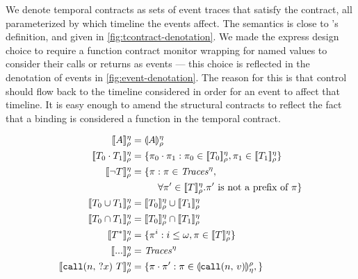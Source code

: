 \documentclass[preprint,onecolumn,9pt]{sigplanconf} %
\begin{document}
We denote temporal contracts as sets of event traces that satisfy the contract, all parameterized by which timeline the events affect.
%
The semantics is close to \citeauthor{ianjohnson:dfm:icfp2011}'s definition, and given in \autoref{fig:tcontract-denotation}.
%
We made the express design choice to require a function contract monitor wrapping for named values to consider their calls or returns as events --- this choice is reflected in the denotation of events in \autoref{fig:event-denotation}.
%
The reason for this is that control should flow back to the timeline considered in order for an event to affect that timeline.
%
It is easy enough to amend the structural contracts to reflect the fact that a binding is considered a function in the temporal contract.
\begin{figure}
  \begin{align*}
   \denotetcon{\mevent}{\mtimeline}{\menv} &=
   \denoteevent{\mevent}{\menv}{\mtimeline}
\\
   \denotetcon{\stseq{\mtcon_0}{\mtcon_1}}{\mtimeline}{\menv} &=
   \setbuild{\mtrace_0 \cdot \mtrace_1}{\mtrace_0 \in \denotetcon{\mtcon_0}{\mtimeline}{\menv}, \mtrace_1 \in \denotetcon{\mtcon_1}{\mtimeline}{\menv}}
\\   
   \denotetcon{\stnot{\mtcon}}{\mtimeline}{\menv} &=
    \setbuild{\mtrace}{\mtrace \in \Traces^\mtimeline, \\
                      &\phantom{= \{ \mtrace : } \forall \mtrace' \in \denotetcon{\mtcon}{\mtimeline}{\menv}. \mtrace' \text{ is not a prefix of } \mtrace}
\\
   \denotetcon{\stOr{\mtcon_0}{\mtcon_1}}{\mtimeline}{\menv} &=
   \denotetcon{\mtcon_0}{\mtimeline}{\menv} \cup \denotetcon{\mtcon_1}{\mtimeline}{\menv}
\\
   \denotetcon{\stAnd{\mtcon_0}{\mtcon_1}}{\mtimeline}{\menv} &=
   \denotetcon{\mtcon_0}{\mtimeline}{\menv} \cap \denotetcon{\mtcon_1}{\mtimeline}{\menv}
\\
   \denotetcon{\stmany{\mtcon}}{\mtimeline}{\menv} &=
   \setbuild{\mtrace^i}{i \le \omega, \mtrace \in \denotetcon{\mtcon}{\mtimeline}{\menv}}
\\
   \denotetcon{\sddd}{\mtimeline}{\menv} &=
   \Traces^\mtimeline
\\
   \denotetcon{\stcall{\mname}{\mvar}{\mtcon}}{\mtimeline}{\menv} &=
   \setbuild{\mtrace \cdot \mtrace'}
            {\mtrace \in \denoteevent{\scallev{\mname}{\mval}}{\mtimeline}{\menv}, 
}
\end{align*}
\end{figure}
\end{document}
